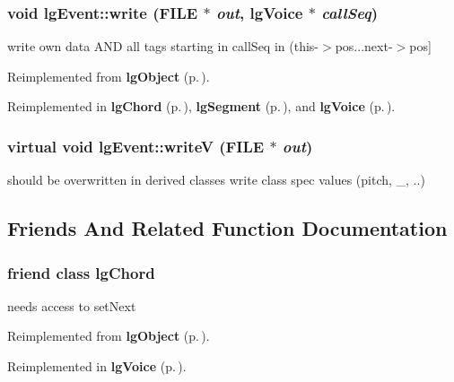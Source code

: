 \subsubsection{\setlength{\rightskip}{0pt plus 5cm}void lg\-Event::write (FILE $\ast$ {\em out}, {\bf lg\-Voice} $\ast$ {\em call\-Seq})\hspace{0.3cm}{\tt  [virtual]}}\label{classlgEvent_a8}


write own data AND all tags starting in call\-Seq in (this-$>$pos...next-$>$pos] 



Reimplemented from {\bf lg\-Object} {\rm (p.\,\pageref{classlgObject_a4})}.

Reimplemented in {\bf lg\-Chord} {\rm (p.\,\pageref{classlgChord_a7})}, {\bf lg\-Segment} {\rm (p.\,\pageref{classlgSegment_a22})}, and {\bf lg\-Voice} {\rm (p.\,\pageref{classlgVoice_a21})}.
\subsubsection{\setlength{\rightskip}{0pt plus 5cm}virtual void lg\-Event::write\-V (FILE $\ast$ {\em out})\hspace{0.3cm}{\tt  [inline, protected, virtual]}}\label{classlgEvent_b0}


should be overwritten in derived classes write class spec values (pitch, \_\-, ..) 

\subsection{Friends And Related Function Documentation}
\subsubsection{\setlength{\rightskip}{0pt plus 5cm}friend class {\bf lg\-Chord}\hspace{0.3cm}{\tt  [friend]}}\label{classlgEvent_n1}


needs access to set\-Next 



Reimplemented from {\bf lg\-Object} {\rm (p.\,\pageref{classlgObject_n5})}.

Reimplemented in {\bf lg\-Voice} {\rm (p.\,\pageref{classlgVoice_n0})}.
